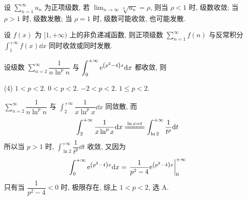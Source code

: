 \begin{theorem}[根值审敛法]
    设 $\displaystyle \sum_{n=1}^{\infty} u_{n} $ 为正项级数, 若 $\displaystyle \lim _{n \to \infty} \sqrt[n]{u_{n}}=\rho $, 则当 $ \rho<1 $ 时, 级数收敛;
    当 $ \rho>1 $ 时, 级数发散; 当 $ \rho=1 $ 时, 级数可能收敛, 也可能发散.
\end{theorem}

\begin{theorem}[积分判别法]
    设 $ f(x) $ 为 $ [1,+\infty) $ 上的非负递减函数, 则正项级数 $\displaystyle  \sum_{n=1}^{\infty} f(n) $ 与反常积分 $\displaystyle \int_{1}^{+\infty} f(x) \dd x $ 同时收敛或同时发散.
\end{theorem}

\begin{example}
    设级数 $ \displaystyle \sum_{n=2}^{\infty} \dfrac{1}{n\ln ^{p}n} $ 与 $ \displaystyle \int_{0}^{+\infty} \mathrm{e} ^{\qty(p^2-4)x} \dd x $ 都收敛, 则
    \begin{tasks}(4)
        \task $1<p<2$.
        \task $0<p<2$.
        \task $-2<p<2$.
        \task $1\leqslant p<2$.
    \end{tasks}
\end{example}
\begin{solution}
    $ \displaystyle \sum_{n=2}^{\infty} \dfrac{1}{n\ln ^{p}n} $ 与 $\displaystyle \int_{2}^{+\infty} \dfrac{1}{x\ln ^{p}x} \dd x$ 同敛散, 而 $$
        \int_{2}^{+\infty} \dfrac{1}{x\ln ^{p}x} \dd x\xlongequal{\ln x=t}\int_{\ln 2}^{+\infty} \dfrac{1}{t^p} \dd t
    $$
    所以当 $p>1$ 时, $ \displaystyle \int_{\ln 2}^{+\infty} \dfrac{1}{t^p} \dd t $ 收敛, 又因为
    $$
        \int_{0}^{+\infty} \e ^{\qty(p^2-4)x} \dd x=\eval{\dfrac{1}{p^2-4}\e ^{\qty(p^2-4)x}}_{0}^{+\infty}
    $$
    只有当 $\dfrac{1}{p^2-4}<0$ 时, 极限存在, 综上 $1<p<2$, 选 A.
\end{solution}

